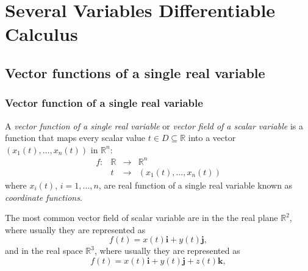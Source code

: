 
\section{Several Variables Differentiable Calculus}



\subsection{Vector functions of a single real variable}

\begin{frame}
\frametitle{Vector function of a single real variable}

\begin{definition}
A \emph{vector function of a single real variable} or \emph{vector field of a scalar variable} is a function that maps every scalar value $t\in D\subseteq \mathbb{R}$ into a vector $(x_1(t),\ldots,x_n(t))$ in $\mathbb{R}^n$:
\[
\begin{array}{rccl}
f: & \mathbb{R} & \longrightarrow & \mathbb{R}^n\\
& t & \longrightarrow & (x_1(t),\ldots, x_n(t))
\end{array}
\]
where $x_i(t)$, $i=1,\ldots,n$, are real function of a single real variable known as \emph{coordinate functions}.
\end{definition}

The most common vector field of scalar variable are in the the real plane $\mathbb{R}^2$, where usually they are represented as
\[
f(t)=x(t)\mathbf{i}+y(t)\mathbf{j},
\]
and in the real space $\mathbb{R}^3$, where usually they are represented as
\[
f(t)=x(t)\mathbf{i}+y(t)\mathbf{j}+z(t)\mathbf{k},
\]
\end{frame}


